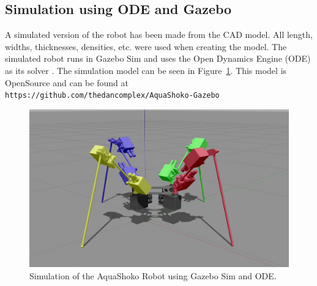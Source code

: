\subsection{Simulation using ODE and Gazebo}
A simulated version of the robot has been made from the CAD model.
All length, widths, thicknesses, densities, etc. were used when creating the model.
The simulated robot runs in Gazebo Sim \cite{gazebo} and uses the Open Dynamics Engine (ODE) as its solver \cite{ode:2008}.
The simulation model can be seen in Figure~\ref{fig:gazebo}.
This model is OpenSource and can be found at \tiny \texttt{https://github.com/thedancomplex/AquaShoko-Gazebo}\normalsize{}

\begin{figure}[!t]
\centering
\includegraphics[width=1.0\columnwidth]{./img/AquaShoko-Sim-c.jpg}
\caption{Simulation of the AquaShoko Robot using Gazebo Sim and ODE.}
\label{fig:gazebo}
\end{figure}





